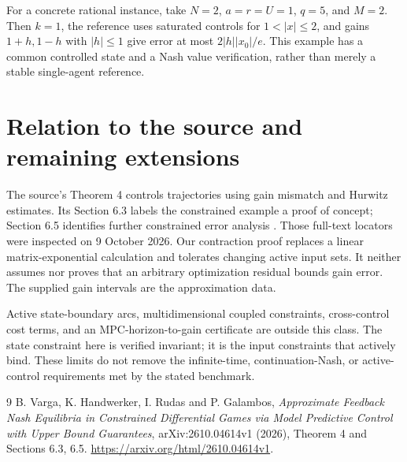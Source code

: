 \documentclass[11pt]{article}
\theoremstyle{remark}
\begin{document}
For a concrete rational instance, take $N=2$, $a=r=U=1$, $q=5$, and $M=2$. Then $k=1$, the reference uses saturated controls for $1<|x|\leq2$, and gains $1+h,1-h$ with $|h|\leq1$ give error at most $2|h||x_0|/e$. This example has a common controlled state and a Nash value verification, rather than merely a stable single-agent reference.

\section{Relation to the source and remaining extensions}
The source's Theorem 4 controls trajectories using gain mismatch and Hurwitz estimates. Its Section 6.3 labels the constrained example a proof of concept; Section 6.5 identifies further constrained error analysis \cite{varga}. Those full-text locators were inspected on 9 October 2026. Our contraction proof replaces a linear matrix-exponential calculation and tolerates changing active input sets. It neither assumes nor proves that an arbitrary optimization residual bounds gain error. The supplied gain intervals are the approximation data.

Active state-boundary arcs, multidimensional coupled constraints, cross-control cost terms, and an MPC-horizon-to-gain certificate are outside this class. The state constraint here is verified invariant; it is the input constraints that actively bind. These limits do not remove the infinite-time, continuation-Nash, or active-control requirements met by the stated benchmark.

\begin{thebibliography}{9}
 B. Varga, K. Handwerker, I. Rudas and P. Galambos, \emph{Approximate Feedback Nash Equilibria in Constrained Differential Games via Model Predictive Control with Upper Bound Guarantees}, arXiv:2610.04614v1 (2026), Theorem 4 and Sections 6.3, 6.5. \url{https://arxiv.org/html/2610.04614v1}.
\end{thebibliography}
\end{document}

